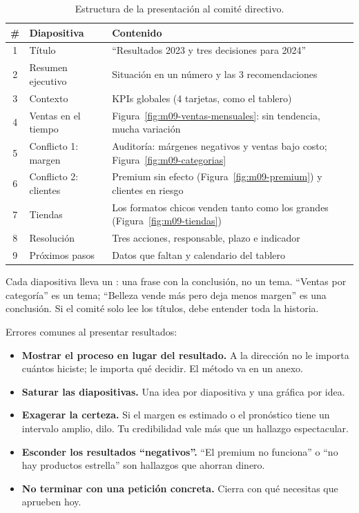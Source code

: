 \begin{table}[H]
\centering
\small
\caption{Estructura de la presentación al comité directivo.}
\label{tab:m09-diapositivas}
\begin{tabularx}{\textwidth}{@{}c l X@{}}
\toprule
\# & Diapositiva & Contenido \\
\midrule
1 & Título & ``Resultados 2023 y tres decisiones para 2024'' \\
2 & Resumen ejecutivo & Situación en un número y las 3 recomendaciones \\
3 & Contexto & KPIs globales (4 tarjetas, como el tablero) \\
4 & Ventas en el tiempo & Figura~\ref{fig:m09-ventas-mensuales}: sin tendencia, mucha variación \\
5 & Conflicto 1: margen & Auditoría: márgenes negativos y ventas bajo costo; Figura~\ref{fig:m09-categorias} \\
6 & Conflicto 2: clientes & Premium sin efecto (Figura~\ref{fig:m09-premium}) y clientes en riesgo \\
7 & Tiendas & Los formatos chicos venden tanto como los grandes (Figura~\ref{fig:m09-tiendas}) \\
8 & Resolución & Tres acciones, responsable, plazo e indicador \\
9 & Próximos pasos & Datos que faltan y calendario del tablero \\
\bottomrule
\end{tabularx}
\end{table}

Cada diapositiva lleva un : una frase con la
conclusión, no un tema. ``Ventas por categoría'' es un tema; ``Belleza vende
más pero deja menos margen'' es una conclusión. Si el comité solo lee los
títulos, debe entender toda la historia.

\begin{advertencia}
Errores comunes al presentar resultados:
\begin{itemize}
  \item \textbf{Mostrar el proceso en lugar del resultado.} A la dirección
        no le importa cuántos  hiciste; le importa qué
        decidir. El método va en un anexo.
  \item \textbf{Saturar las diapositivas.} Una idea por diapositiva y una
        gráfica por idea.
  \item \textbf{Exagerar la certeza.} Si el margen es estimado o el
        pronóstico tiene un intervalo amplio, dilo. Tu credibilidad vale más
        que un hallazgo espectacular.
  \item \textbf{Esconder los resultados ``negativos''.} ``El premium no
        funciona'' o ``no hay productos estrella'' son hallazgos que ahorran
        dinero.
  \item \textbf{No terminar con una petición concreta.} Cierra con qué
        necesitas que aprueben hoy.
\end{itemize}
\end{advertencia}

